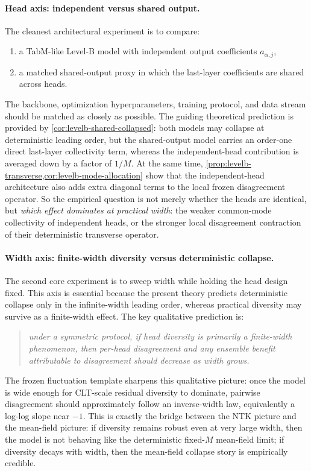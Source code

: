 \documentclass[11pt]{article}
\theoremstyle{definition}
\begin{document}
\paragraph{Head axis: independent versus shared output.}
The cleanest architectural experiment is to compare:
\begin{enumerate}[leftmargin=2em]
  \item a TabM-like Level-B model with independent output coefficients $a_{\alpha,j}$,
  \item a matched shared-output proxy in which the last-layer coefficients are shared across heads.
\end{enumerate}
The backbone, optimization hyperparameters, training protocol, and data stream should be matched as closely as possible.
The guiding theoretical prediction is provided by \cref{cor:levelb-shared-collapsed}:
both models may collapse at deterministic leading order,
but the shared-output model carries an order-one direct last-layer collectivity term,
whereas the independent-head contribution is averaged down by a factor of $1/M$.
At the same time, \cref{prop:levelb-transverse,cor:levelb-mode-allocation} show that the independent-head architecture also adds extra diagonal terms to the local frozen disagreement operator.
So the empirical question is not merely whether the heads are identical,
but \emph{which effect dominates at practical width}:
the weaker common-mode collectivity of independent heads,
or the stronger local disagreement contraction of their deterministic transverse operator.

\paragraph{Width axis: finite-width diversity versus deterministic collapse.}
The second core experiment is to sweep width while holding the head design fixed.
This axis is essential because the present theory predicts deterministic collapse only in the infinite-width leading order,
whereas practical diversity may survive as a finite-width effect.
The key qualitative prediction is:
\begin{quote}
\emph{under a symmetric protocol, if head diversity is primarily a finite-width phenomenon,
then per-head disagreement and any ensemble benefit attributable to disagreement should decrease as width grows.}
\end{quote}
The frozen fluctuation template sharpens this qualitative picture:
once the model is wide enough for CLT-scale residual diversity to dominate,
pairwise disagreement should approximately follow an inverse-width law,
equivalently a log-log slope near $-1$.
This is exactly the bridge between the NTK picture and the mean-field picture:
if diversity remains robust even at very large width, then the model is not behaving like the deterministic fixed-$M$ mean-field limit;
if diversity decays with width, then the mean-field collapse story is empirically credible.
\end{document}
